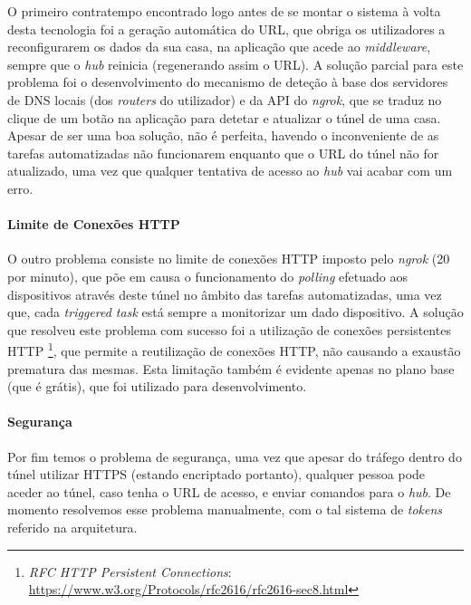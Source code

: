 O primeiro contratempo encontrado logo antes de se montar o sistema à volta desta tecnologia foi a geração automática do URL, que obriga os utilizadores a reconfigurarem os dados da sua casa, na aplicação que acede ao \textit{middleware}, sempre que o \textit{hub} reinicia (regenerando assim o URL). A solução parcial para este problema foi o desenvolvimento do mecanismo de deteção à base dos servidores de DNS locais (dos \textit{routers} do utilizador) e da API do \textit{ngrok}, que se traduz no clique de um botão na aplicação para detetar e atualizar o túnel de uma casa. Apesar de ser uma boa solução, não é perfeita, havendo o inconveniente de as tarefas automatizadas não funcionarem enquanto que o URL do túnel não for atualizado, uma vez que qualquer tentativa de acesso ao \textit{hub} vai acabar com um erro.

\paragraph*{Limite de Conexões HTTP}

O outro problema consiste no limite de conexões HTTP imposto pelo \textit{ngrok} (20 por minuto), que põe em causa o funcionamento do \textit{polling} efetuado aos dispositivos através deste túnel no âmbito das tarefas automatizadas, uma vez que, cada \textit{triggered task} está sempre a monitorizar um dado dispositivo. A solução que resolveu este problema com sucesso foi a utilização de conexões persistentes HTTP \footnote{\textit{RFC HTTP Persistent Connections}: \url{https://www.w3.org/Protocols/rfc2616/rfc2616-sec8.html}}, que permite a reutilização de conexões HTTP, não causando a exaustão prematura das mesmas. Esta limitação também é evidente apenas no plano base (que é grátis), que foi utilizado para desenvolvimento.

\paragraph*{Segurança}

Por fim temos o problema de segurança, uma vez que apesar do tráfego dentro do túnel utilizar HTTPS (estando encriptado portanto), qualquer pessoa pode aceder ao túnel, caso tenha o URL de acesso, e enviar comandos para o \textit{hub}. De momento resolvemos esse problema manualmente, com o tal sistema de \textit{tokens} referido na arquitetura.

